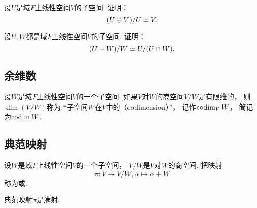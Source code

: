 \begin{example}
设\(U\)是域\(F\)上线性空间\(V\)的子空间.
证明：\[
	(U \oplus V)/U
	\simeq
	V.
\]
\end{example}

\begin{example}
设\(U,W\)都是域\(F\)上线性空间\(V\)的子空间.
证明：\[
	(U+W)/W \simeq U/(U \cap W).
\]
\end{example}

\subsection{余维数}
\begin{definition}
设\(W\)是域\(F\)上线性空间\(V\)的一个子空间.
如果\(V\)对\(W\)的商空间\(V/W\)是有限维的，
则\(\dim(V/W)\)称为
“子空间\(W\)在\(V\)中的（codimension）”，
记作\(\operatorname{codim}_V W\)，
简记为\(\operatorname{codim} W\).
\end{definition}

\subsection{典范映射}
\begin{definition}
设\(W\)是域\(F\)上线性空间\(V\)的一个子空间，
\(V/W\)是\(V\)对\(W\)的商空间.
把映射\[
	\pi\colon V \to V/W,
	\alpha \mapsto \alpha+W
\]称为或.
\end{definition}
\begin{remark}
典范映射\(\pi\)是满射.
\end{remark}
